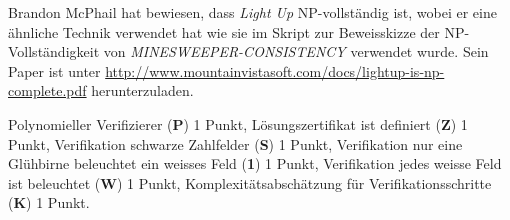 \begin{diskussion}
Brandon McPhail hat bewiesen, dass {\em Light Up} NP-vollständig ist,
wobei er eine ähnliche Technik verwendet hat wie sie im Skript zur
Beweisskizze der NP-Vollständigkeit von \textsl{MINESWEEPER-CONSISTENCY}
verwendet wurde.
Sein Paper ist unter
\url{http://www.mountainvistasoft.com/docs/lightup-is-np-complete.pdf}
herunterzuladen.
\end{diskussion}

\begin{bewertung}
Polynomieller Verifizierer ({\bf P}) 1 Punkt,
Lösungszertifikat ist definiert ({\bf Z}) 1 Punkt,
Verifikation schwarze Zahlfelder ({\bf S}) 1 Punkt,
Verifikation nur eine Glühbirne beleuchtet ein weisses Feld ({\bf 1}) 1 Punkt,
Verifikation jedes weisse Feld ist beleuchtet ({\bf W}) 1 Punkt,
Komplexitätsabschätzung für Verifikationsschritte ({\bf K}) 1 Punkt.
\end{bewertung}

